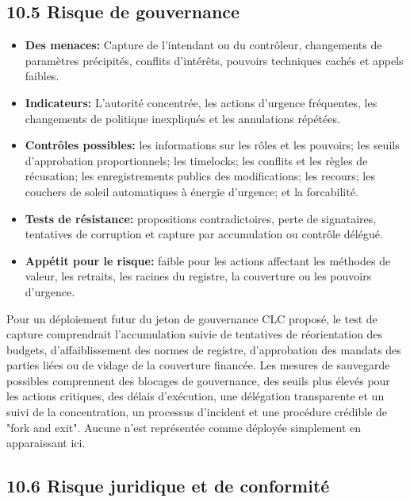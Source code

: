 \documentclass[11pt]{article}
\begin{document}
\subsection*{10.5 Risque de gouvernance}

\begin{itemize}[leftmargin=*]
\item \textbf{Des menaces:} Capture de l'intendant ou du contrôleur, changements de paramètres précipités, conflits d'intérêts, pouvoirs techniques cachés et appels faibles.
\item \textbf{Indicateurs:} L'autorité concentrée, les actions d'urgence fréquentes, les changements de politique inexpliqués et les annulations répétées.
\item \textbf{Contrôles possibles:} les informations sur les rôles et les pouvoirs; les seuils d'approbation proportionnels; les timelocks; les conflits et les règles de récusation; les enregistrements publics des modifications; les recours; les couchers de soleil automatiques à énergie d'urgence; et la forcabilité.
\item \textbf{Tests de résistance:} propositions contradictoires, perte de signataires, tentatives de corruption et capture par accumulation ou contrôle délégué.
\item \textbf{Appétit pour le risque:} faible pour les actions affectant les méthodes de valeur, les retraits, les racines du registre, la couverture ou les pouvoirs d'urgence.
\end{itemize}
Pour un déploiement futur du jeton de gouvernance CLC proposé, le test de capture comprendrait l'accumulation suivie de tentatives de réorientation des budgets, d'affaiblissement des normes de registre, d'approbation des mandats des parties liées ou de vidage de la couverture financée. Les mesures de sauvegarde possibles comprennent des blocages de gouvernance, des seuils plus élevés pour les actions critiques, des délais d'exécution, une délégation transparente et un suivi de la concentration, un processus d'incident et une procédure crédible de "fork and exit". Aucune n'est représentée comme déployée simplement en apparaissant ici.

\subsection*{10.6 Risque juridique et de conformité}
\end{document}
